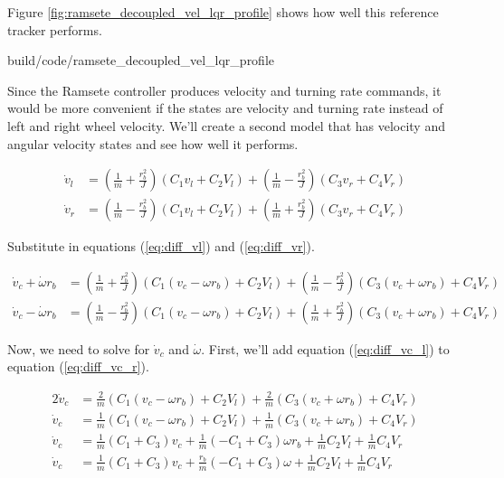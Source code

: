 Figure \ref{fig:ramsete_decoupled_vel_lqr_profile} shows how well this
\gls{reference} tracker performs.

\begin{svg}{build/code/ramsete_decoupled_vel_lqr_profile}
  \caption{Left/right velocity reference tracker response to a motion profile}
  \label{fig:ramsete_decoupled_vel_lqr_profile}
\end{svg}

Since the Ramsete controller produces velocity and turning rate commands, it
would be more convenient if the \glspl{state} are velocity and turning rate
instead of left and right wheel velocity. We'll create a second model that has
velocity and angular velocity states and see how well it performs.

\begin{align*}
  \dot{v}_l &= \left(\frac{1}{m} + \frac{r_b^2}{J}\right)
    \left(C_1 v_l + C_2 V_l\right) +
    \left(\frac{1}{m} - \frac{r_b^2}{J}\right) \left(C_3 v_r + C_4 V_r\right) \\
  \dot{v}_r &= \left(\frac{1}{m} - \frac{r_b^2}{J}\right)
    \left(C_1 v_l + C_2 V_l\right) +
    \left(\frac{1}{m} + \frac{r_b^2}{J}\right) \left(C_3 v_r + C_4 V_r\right)
\end{align*}

Substitute in equations (\ref{eq:diff_vl}) and (\ref{eq:diff_vr}).

\begin{align}
  \dot{v}_c + \dot{\omega} r_b &= \left(\frac{1}{m} + \frac{r_b^2}{J}\right)
    \left(C_1(v_c - \omega r_b) + C_2 V_l\right) +
    \left(\frac{1}{m} - \frac{r_b^2}{J}\right) \left(C_3(v_c + \omega r_b) +
      C_4 V_r\right) \label{eq:diff_vc_l} \\
  \dot{v}_c - \dot{\omega} r_b &= \left(\frac{1}{m} - \frac{r_b^2}{J}\right)
    \left(C_1(v_c - \omega r_b) + C_2 V_l\right) +
    \left(\frac{1}{m} + \frac{r_b^2}{J}\right) \left(C_3(v_c + \omega r_b) +
      C_4 V_r\right) \label{eq:diff_vc_r}
\end{align}

Now, we need to solve for $\dot{v}_c$ and $\dot{\omega}$. First, we'll add
equation (\ref{eq:diff_vc_l}) to equation (\ref{eq:diff_vc_r}).

\begin{align*}
  2\dot{v}_c &= \frac{2}{m} \left(C_1(v_c - \omega r_b) + C_2 V_l\right) +
    \frac{2}{m} \left(C_3(v_c + \omega r_b) + C_4 V_r\right) \\
  \dot{v}_c &= \frac{1}{m} \left(C_1(v_c - \omega r_b) + C_2 V_l\right) +
    \frac{1}{m} \left(C_3(v_c + \omega r_b) + C_4 V_r\right) \\
  \dot{v}_c &= \frac{1}{m} (C_1 + C_3) v_c +
    \frac{1}{m} (-C_1 + C_3) \omega r_b + \frac{1}{m} C_2 V_l +
    \frac{1}{m} C_4 V_r \\
  \dot{v}_c &= \frac{1}{m} (C_1 + C_3) v_c + \frac{r_b}{m} (-C_1 + C_3) \omega +
    \frac{1}{m} C_2 V_l + \frac{1}{m} C_4 V_r
\end{align*}

